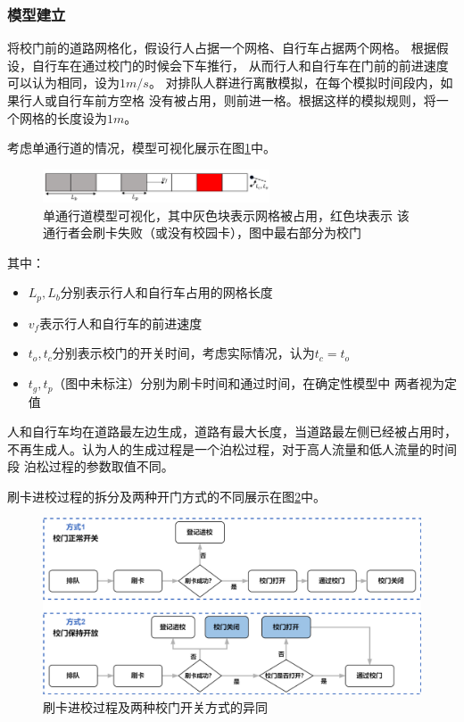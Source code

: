 \subsubsection{模型建立}
\par 将校门前的道路网格化，假设行人占据一个网格、自行车占据两个网格。
根据假设，自行车在通过校门的时候会下车推行，
从而行人和自行车在门前的前进速度可以认为相同，设为$1m/s$。
对排队人群进行离散模拟，在每个模拟时间段内，如果行人或自行车前方空格
没有被占用，则前进一格。根据这样的模拟规则，将一个网格的长度设为$1m$。
\par 考虑单通行道的情况，模型可视化展示在图\ref{fig:one-lane-model}中。
\begin{figure}[ht]
    \centering
    \includegraphics[width=0.6\textwidth]{images/cellular_automata_1_lane.png}
    \caption{单通行道模型可视化，其中灰色块表示网格被占用，红色块表示
    该通行者会刷卡失败（或没有校园卡），图中最右部分为校门}
    \label{fig:one-lane-model}
\end{figure}
\newline 其中：
\begin{itemize}
    \item $L_p, L_b$分别表示行人和自行车占用的网格长度
    \item $v_f$表示行人和自行车的前进速度
    \item $t_o, t_c$分别表示校门的开关时间，考虑实际情况，认为$t_c=t_o$
    \item $t_g,t_p$（图中未标注）分别为刷卡时间和通过时间，在确定性模型中
    两者视为定值
\end{itemize}
人和自行车均在道路最左边生成，道路有最大长度，当道路最左侧已经被占用时，
不再生成人。认为人的生成过程是一个泊松过程，对于高人流量和低人流量的时间段
泊松过程的参数取值不同。
\par 刷卡进校过程的拆分及两种开门方式的不同展示在图\ref{fig:process-entering-gate}中。
\begin{figure}[ht]    
    \centering
    \includegraphics[width=.7\textwidth]{images/enter_gate_process.png}
    \caption{刷卡进校过程及两种校门开关方式的异同}
    \label{fig:process-entering-gate}
\end{figure}
